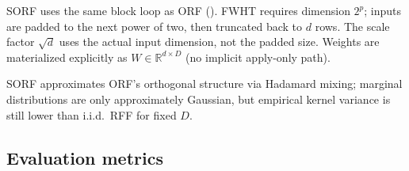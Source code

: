 \documentclass[11pt]{article}
\newcommand{\Ph}{\Phi}
\newcommand{\Om}{\Omega}
\newcommand{\RB}{R_B}
\begin{document}
SORF uses the same block loop as ORF ().
FWHT requires dimension $2^p$; inputs are padded to the next power of two, then truncated back to $d$ rows.
The scale factor $\sqrt{d}$ uses the actual input dimension, not the padded size.
Weights are materialized explicitly as $W \in \mathbb{R}^{d \times D}$ (no implicit apply-only path).

SORF approximates ORF's orthogonal structure via Hadamard mixing; marginal distributions are only
approximately Gaussian, but empirical kernel variance is still lower than i.i.d.\ RFF for fixed $D$.




\subsection{Evaluation metrics}
\label{sec:metrics}
\end{document}
